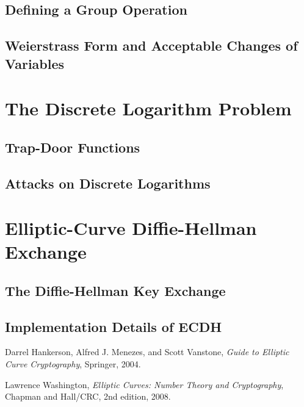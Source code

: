 \documentclass{article}
\begin{document}
\subsection{Defining a Group Operation}

\subsection{Weierstrass Form and Acceptable Changes of Variables}

\section{The Discrete Logarithm Problem}

\subsection{Trap-Door Functions}

\subsection{Attacks on Discrete Logarithms}

\section{Elliptic-Curve Diffie-Hellman Exchange}

\subsection{The Diffie-Hellman Key Exchange}

\subsection{Implementation Details of ECDH}

\begin{thebibliography}{9}

	Darrel Hankerson, Alfred J. Menezes, and Scott Vanstone,
	\emph{Guide to Elliptic Curve Cryptography},
	Springer,
	2004.

	Lawrence Washington,
	\emph{Elliptic Curves: Number Theory and Cryptography},
	Chapman and Hall/CRC,
	2nd edition,
	2008.


\end{thebibliography}
\end{document}
